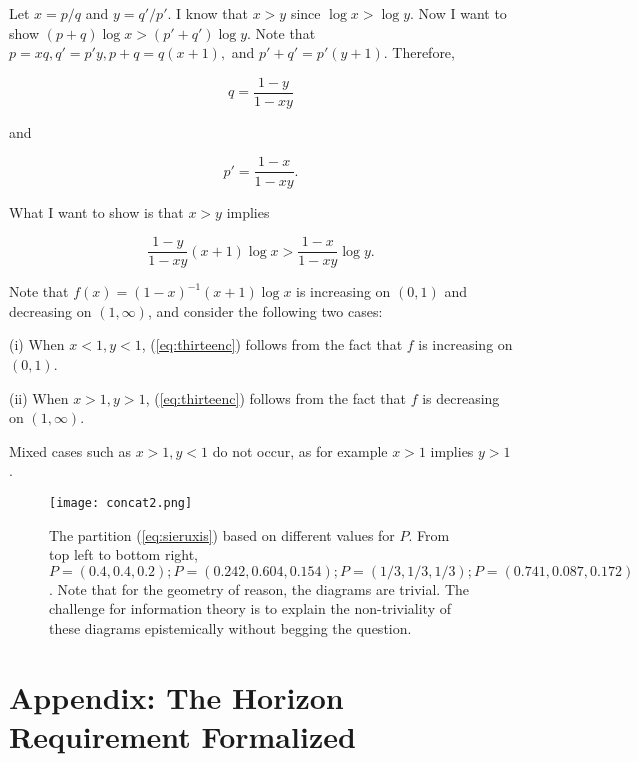 \documentclass[11pt]{article}
\begin{document}
Let $x=p/q$ and $y=q'/p'$. I know that $x>y$ since $\log{}x>\log{}y$.
Now I want to show $(p+q)\log{}x>(p'+q')\log{}y$. Note that
$p=xq,q'=p'y,p+q=q(x+1),$ and $p'+q'=p'(y+1)$. Therefore,

\begin{equation}
  \label{eq:thirteena}
  q=\frac{1-y}{1-xy}
\end{equation}

and

\begin{equation}
  \label{eq:thirteenb}
  p'=\frac{1-x}{1-xy}.
\end{equation}

What I want to show is that $x>y$ implies

\begin{equation}
  \label{eq:thirteenc}
  \frac{1-y}{1-xy}(x+1)\log{}x>\frac{1-x}{1-xy}\log{}y.
\end{equation}

Note that $f(x)=(1-x)^{-1}(x+1)\log{}x$ is increasing on $(0,1)$ and
decreasing on $(1,\infty{})$, and consider the following two cases:

(i) When $x<1,y<1$, (\ref{eq:thirteenc}) follows from the fact that
$f$ is increasing on $(0,1)$.

(ii) When $x>1,y>1$, (\ref{eq:thirteenc}) follows from the fact that
$f$ is decreasing on $(1,\infty)$.

Mixed cases such as $x>1,y<1$ do not occur, as for example $x>1$
implies $y>1$.

\begin{figure}[ht]
  \begin{flushright}
    \begin{minipage}[h]{\linewidth}
      \texttt{[image: concat2.png]}
      \caption{\footnotesize The partition (\ref{eq:sieruxis}) based
        on different values for $P$. From top left to bottom right,
        $P=(0.4,0.4,0.2); P=(0.242,0.604,0.154); P=(1/3,1/3,1/3);
        P=(0.741,0.087,0.172)$.
        Note that for the geometry of reason, the diagrams are
        trivial. The challenge for information theory is to explain
        the non-triviality of these diagrams epistemically without
        begging the question.}
      \label{fig:concat}
    \end{minipage}
  \end{flushright}
\end{figure}

\section{Appendix: The Horizon Requirement Formalized}
\label{app:horform}
\end{document}
